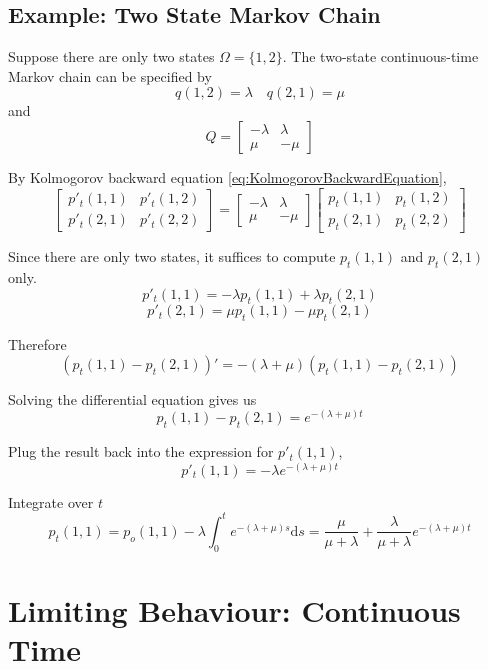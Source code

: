     \subsection{Example: Two State Markov Chain}
        Suppose there are only two states $\Omega = \{1,2\}$. The two-state continuous-time Markov chain can be specified by
        \[ q(1,2) = \lambda \quad q(2,1) = \mu \]
        and
        \[ Q = \begin{bmatrix}
            -\lambda & \lambda\\
            \mu & -\mu
        \end{bmatrix} \]

        By Kolmogorov backward equation \ref{eq:KolmogorovBackwardEquation},
        \[
        \begin{bmatrix}
            p'_t(1,1) & p'_t(1,2)\\
            p'_t(2,1) & p'_t(2,2)
        \end{bmatrix} = 
        \begin{bmatrix}
            -\lambda & \lambda\\
            \mu & -\mu
        \end{bmatrix}
        \begin{bmatrix}
            p_t(1,1) & p_t(1,2)\\
            p_t(2,1) & p_t(2,2)
        \end{bmatrix}
        \]

        Since there are only two states, it suffices to compute $p_t(1,1)$ and $p_t(2,1)$ only.
        \[ p'_t(1,1) = -\lambda p_t(1,1) + \lambda p_t(2,1) \]
        \[ p'_t(2,1) = \mu p_t(1,1) - \mu p_t(2,1) \]

        Therefore
        \[ \left(p_t(1,1)-p_t(2,1)\right)' = -(\lambda + \mu)\left(p_t(1,1)-p_t(2,1)\right) \]

        Solving the differential equation gives us
        \[ p_t(1,1) - p_t(2,1) = e^{-(\lambda + \mu)t} \]

        Plug the result back into the expression for $p'_t(1,1)$,
        \[ p'_t(1,1) = -\lambda e^{-(\lambda + \mu)t} \]

        Integrate over $t$
        \[ p_t(1,1) = p_o(1,1) - \lambda\int_0^t e^{-(\lambda + \mu)s}\mathrm{d}s = \frac{\mu}{\mu + \lambda}+\frac{\lambda}{\mu + \lambda} e^{-(\lambda + \mu)t} \]


\section{Limiting Behaviour: Continuous Time}

